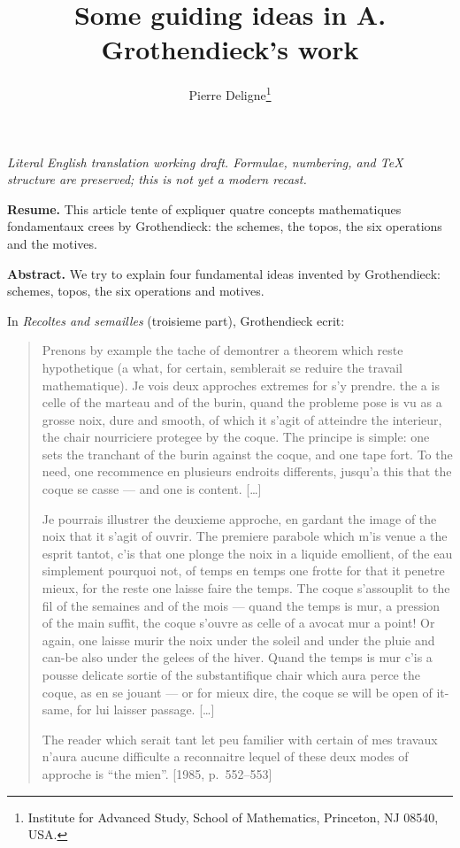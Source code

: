 \documentclass[11pt,a4paper]{article}
\title{Some guiding ideas in A. Grothendieck's work}
\author{Pierre Deligne\footnote{Institute for Advanced Study, School of Mathematics, Princeton, NJ 08540, USA.}}
\date{}
\theoremstyle{plain}
\theoremstyle{definition}
\begin{document}
\begin{center}\small\emph{Literal English translation working draft. Formulae, numbering, and TeX structure are preserved; this is not yet a modern recast.}\end{center}
\vspace{0.5em}

\maketitle

\noindent\textbf{Resume.} This article tente of expliquer quatre concepts mathematiques fondamentaux crees by Grothendieck: the schemes, the topos, the six operations and the motives.

\medskip
\noindent\textbf{Abstract.} We try to explain four fundamental ideas invented by Grothendieck: schemes, topos, the six operations and motives.

\bigskip
\noindent In \emph{Recoltes and semailles} (troisieme part), Grothendieck ecrit:

\begin{quote}
\guillemotleft Prenons by example the tache of demontrer a theorem which reste hypothetique (a what, for certain, semblerait se reduire the travail mathematique). Je vois deux approches extremes for s'y prendre. the a is celle of the marteau and of the burin, quand the probleme pose is vu as a grosse noix, dure and smooth, of which it s'agit of atteindre the interieur, the chair nourriciere protegee by the coque. The principe is simple: one sets the tranchant of the burin against the coque, and one tape fort. To the need, one recommence en plusieurs endroits differents, jusqu'a this that the coque se casse --- and one is content. {[}\ldots{]}

\guillemotleft Je pourrais illustrer the deuxieme approche, en gardant the image of the noix that it s'agit of ouvrir. The premiere parabole which m'is venue a the esprit tantot, c'is that one plonge the noix in a liquide emollient, of the eau simplement pourquoi not, of temps en temps one frotte for that it penetre mieux, for the reste one laisse faire the temps. The coque s'assouplit to the fil of the semaines and of the mois --- quand the temps is mur, a pression of the main suffit, the coque s'ouvre as celle of a avocat mur a point! Or again, one laisse murir the noix under the soleil and under the pluie and can-be also under the gelees of the hiver. Quand the temps is mur c'is a pousse delicate sortie of the substantifique chair which aura perce the coque, as en se jouant --- or for mieux dire, the coque se will be open of it-same, for lui laisser passage. {[}\ldots{]}

\guillemotleft The reader which serait tant let peu familier with certain of mes travaux n'aura aucune difficulte a reconnaitre lequel of these deux modes of approche is ``the mien''.\guillemotright{} [1985, p.~552--553]
\end{quote}
\end{document}
